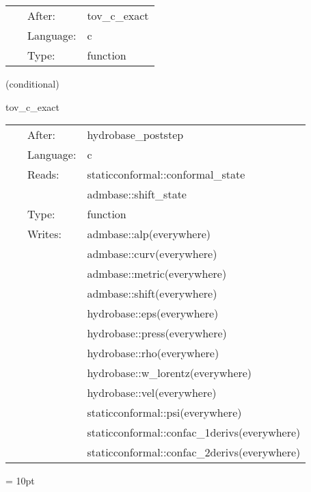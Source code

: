 \hspace{5mm}{\it prepare for fake evolution } 


\hspace{5mm}

 \begin{tabular*}{160mm}{cll} 
~ & After:  & tov\_c\_exact \\ 
~ & Language:  & c \\ 
~ & Type:  & function \\ 
\end{tabular*} 


\vspace{5mm}

   (conditional) 

\hspace{5mm} tov\_c\_exact 

\hspace{5mm}{\it use fake evolution } 


\hspace{5mm}

 \begin{tabular*}{160mm}{cll} 
~ & After:  & hydrobase\_poststep \\ 
~ & Language:  & c \\ 
~ & Reads:  & staticconformal::conformal\_state \\ 
~& ~ &admbase::shift\_state\\ 
~ & Type:  & function \\ 
~ & Writes:  & admbase::alp(everywhere) \\ 
~& ~ &admbase::curv(everywhere)\\ 
~& ~ &admbase::metric(everywhere)\\ 
~& ~ &admbase::shift(everywhere)\\ 
~& ~ &hydrobase::eps(everywhere)\\ 
~& ~ &hydrobase::press(everywhere)\\ 
~& ~ &hydrobase::rho(everywhere)\\ 
~& ~ &hydrobase::w\_lorentz(everywhere)\\ 
~& ~ &hydrobase::vel(everywhere)\\ 
~& ~ &staticconformal::psi(everywhere)\\ 
~& ~ &staticconformal::confac\_1derivs(everywhere)\\ 
~& ~ &staticconformal::confac\_2derivs(everywhere)\\ 
\end{tabular*} 



\vspace{5mm}\parskip = 10pt 

